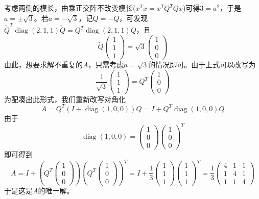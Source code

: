 \documentclass[a4paper,UTF8,fontset=windows]{ctexart}
\DeclareMathOperator{\diag}{diag}
\begin{document}
\begin{enumerate}
\begin{enumerate}
\begin{enumerate}
            考虑两侧的模长，由乘正交阵不改变模长($x^Tx=x^TQ^TQx$)可得$3=a^2$，于是$a=\pm\sqrt{3}$。若$a=-\sqrt{3}$，记$\tilde{Q}=-Q$，可发现$\tilde{Q}^T\diag(2,1,1)\tilde{Q}=Q^T\diag(2,1,1)Q$，且
            $$\tilde{Q}\begin{pmatrix}1\\1\\1\end{pmatrix}=\sqrt{3}\begin{pmatrix}1\\0\\0\end{pmatrix}$$
            由此，想要求解不重复的$A$，只需考虑$a=\sqrt{3}$的情况即可。由于上式可以改写为
            $$\frac{1}{\sqrt3}\begin{pmatrix}1\\1\\1\end{pmatrix}=Q^T\begin{pmatrix}1\\0\\0\end{pmatrix}$$
            为配凑出此形式，我们重新改写对角化
            $$A=Q^T(I+\diag(1,0,0))Q=I+Q^T\diag(1,0,0)Q$$
            由于
            $$\diag(1,0,0)=\begin{pmatrix}1\\0\\0\end{pmatrix}\begin{pmatrix}1\\0\\0\end{pmatrix}^T$$
            即可得到
            $$A=I+\left(Q^T\begin{pmatrix}1\\0\\0\end{pmatrix}\right)\left(Q^T\begin{pmatrix}1\\0\\0\end{pmatrix}\right)^T=I+\frac{1}{3}\begin{pmatrix}1\\1\\1\end{pmatrix}\begin{pmatrix}1\\1\\1\end{pmatrix}^T=\frac{1}{3}\begin{pmatrix}4&1&1\\1&4&1\\1&1&4\end{pmatrix}$$
            于是这是$A$的唯一解。


\end{enumerate}
\end{enumerate}
\end{enumerate}
\end{document}

